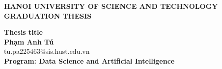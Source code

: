 \documentclass[Main.tex]{subfiles}
\begin{document}
\begin{titlepage}
\thispagestyle{empty}
\begin{center}

{\textbf{\large{HANOI UNIVERSITY OF SCIENCE AND TECHNOLOGY }}}\\[4cm]

{\textbf{\huge{GRADUATION THESIS}}}\\[1cm]
{\textbf{\Large{Thesis title}}\\[1cm]

{\textbf{\large{Phạm Anh Tú}}}\\
{\large{tu.pa225463@sis.hust.edu.vn}}\\[0.5cm]

{\textbf{\large{Program: Data Science and Artificial Intelligence}}}\\

\vspace{4cm}
\begin{table}[H]
\centering
{}
\end{table}}
\end{center}



\end{titlepage}
\end{document}
